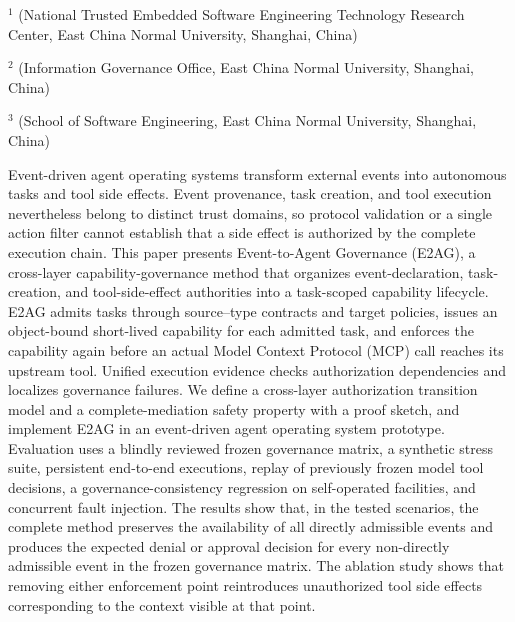 \vspace{8pt}
\vspace{4pt}
\vspace{3pt}
\begingroup\fontsize{7.5pt}{10pt}\selectfont
\noindent$^{1}$ (National Trusted Embedded Software Engineering Technology Research Center, East China Normal University, Shanghai, China)\par
\noindent$^{2}$ (Information Governance Office, East China Normal University, Shanghai, China)\par
\noindent$^{3}$ (School of Software Engineering, East China Normal University, Shanghai, China)\par
\endgroup

\begin{josenabstract}
Event-driven agent operating systems transform external events into autonomous tasks and tool side effects. Event provenance, task creation, and tool execution nevertheless belong to distinct trust domains, so protocol validation or a single action filter cannot establish that a side effect is authorized by the complete execution chain. This paper presents Event-to-Agent Governance (E2AG), a cross-layer capability-governance method that organizes event-declaration, task-creation, and tool-side-effect authorities into a task-scoped capability lifecycle. E2AG admits tasks through source--type contracts and target policies, issues an object-bound short-lived capability for each admitted task, and enforces the capability again before an actual Model Context Protocol (MCP) call reaches its upstream tool. Unified execution evidence checks authorization dependencies and localizes governance failures. We define a cross-layer authorization transition model and a complete-mediation safety property with a proof sketch, and implement E2AG in an event-driven agent operating system prototype. Evaluation uses a blindly reviewed frozen governance matrix, a synthetic stress suite, persistent end-to-end executions, replay of previously frozen model tool decisions, a governance-consistency regression on self-operated facilities, and concurrent fault injection. The results show that, in the tested scenarios, the complete method preserves the availability of all directly admissible events and produces the expected denial or approval decision for every non-directly admissible event in the frozen governance matrix. The ablation study shows that removing either enforcement point reintroduces unauthorized tool side effects corresponding to the context visible at that point.
\end{josenabstract}

\vspace{8pt}
